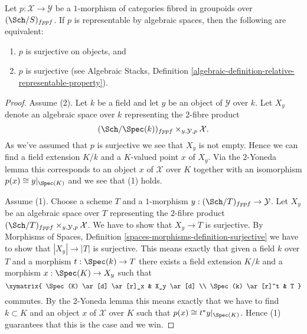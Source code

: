 \begin{lemma}
\label{lemma-representable-by-spaces-surjective}
Let $p : \mathcal{X} \to \mathcal{Y}$ be a $1$-morphism of categories
fibred in groupoids over $(\Sch/S)_{fppf}$. If $p$ is
representable by algebraic spaces, then the following are equivalent:
\begin{enumerate}
\item $p$ is surjective on objects, and
\item $p$ is surjective (see
Algebraic Stacks,
Definition \ref{algebraic-definition-relative-representable-property}).
\end{enumerate}
\end{lemma}

\begin{proof}
Assume (2). Let $k$ be a field and let $y$ be an object of
$\mathcal{Y}$ over $k$. Let $X_y$ denote an algebraic space over $k$
representing the $2$-fibre product
$$
(\Sch/\Spec(k))_{fppf} \times_{y, \mathcal{Y}, p} \mathcal{X}.
$$
As we've assumed that $p$ is surjective we see that $X_y$ is not empty.
Hence we can find a field extension $K/k$ and a $K$-valued point
$x$ of $X_y$. Via the $2$-Yoneda lemma this corresponds to an object
$x$ of $\mathcal{X}$ over $K$ together with an isomorphism
$p(x) \cong y|_{\Spec(K)}$ and we see that (1) holds.

\medskip\noindent
Assume (1). Choose a scheme $T$ and a $1$-morphism
$y : (\Sch/T)_{fppf} \to \mathcal{Y}$. Let
$X_y$ be an algebraic space over $T$ representing the $2$-fibre product
$(\Sch/T)_{fppf} \times_{y, \mathcal{Y}, p} \mathcal{X}$.
We have to show that $X_y \to T$ is surjective. By
Morphisms of Spaces, Definition \ref{spaces-morphisms-definition-surjective}
we have to show that $|X_y| \to |T|$ is surjective.
This means exactly that given a field $k$ over $T$ and a
morphism $t : \Spec(k) \to T$ there exists a field extension
$K/k$ and a morphism $x : \Spec(K) \to X_y$ such that
$$
\xymatrix{
\Spec(K) \ar[d] \ar[r]_x & X_y \ar[d] \\
\Spec(k) \ar[r]^t & T
}
$$
commutes. By the $2$-Yoneda lemma this means exactly that we have to find
$k \subset K$ and an object $x$ of $\mathcal{X}$ over $K$ such that
$p(x) \cong t^*y|_{\Spec(K)}$. Hence (1) guarantees that this is
the case and we win.
\end{proof}












